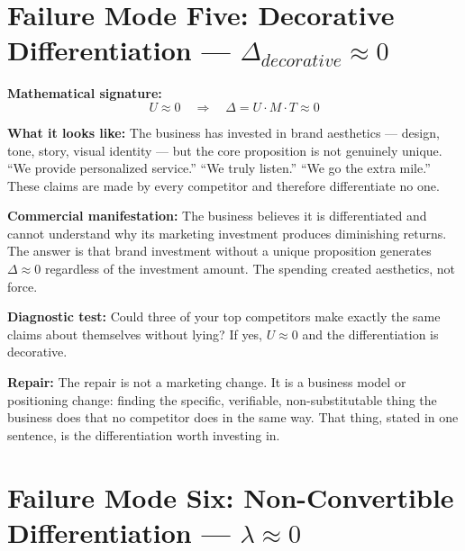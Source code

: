 \documentclass[12pt, openany]{book}
\theoremstyle{thmstyle}
\theoremstyle{defstyle}
\begin{document}
\section{Failure Mode Five: Decorative Differentiation --- $\Delta_{decorative} \approx 0$}

\begin{failbox}
\textbf{Mathematical signature:}
\[
U \approx 0 \quad \Rightarrow \quad \Delta = U \cdot M \cdot T \approx 0
\]

\textbf{What it looks like:} The business has invested in brand aesthetics --- design, tone, story, visual identity --- but the core proposition is not genuinely unique. ``We provide personalized service.'' ``We truly listen.'' ``We go the extra mile.'' These claims are made by every competitor and therefore differentiate no one.

\textbf{Commercial manifestation:} The business believes it is differentiated and cannot understand why its marketing investment produces diminishing returns. The answer is that brand investment without a unique proposition generates $\Delta \approx 0$ regardless of the investment amount. The spending created aesthetics, not force.

\textbf{Diagnostic test:} Could three of your top competitors make exactly the same claims about themselves without lying? If yes, $U \approx 0$ and the differentiation is decorative.

\textbf{Repair:} The repair is not a marketing change. It is a business model or positioning change: finding the specific, verifiable, non-substitutable thing the business does that no competitor does in the same way. That thing, stated in one sentence, is the differentiation worth investing in.
\end{failbox}

\section{Failure Mode Six: Non-Convertible Differentiation --- $\lambda \approx 0$}
\end{document}

